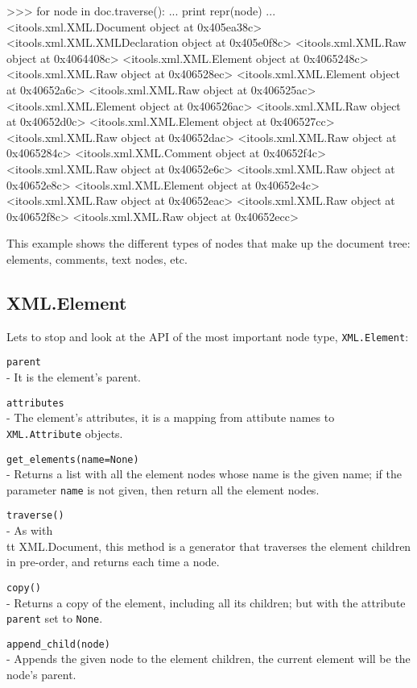 \begin{code}
    >>> for node in doc.traverse():
    ...     print repr(node)
    ... 
    <itools.xml.XML.Document object at 0x405ea38c>
    <itools.xml.XML.XMLDeclaration object at 0x405e0f8c>
    <itools.xml.XML.Raw object at 0x4064408c>
    <itools.xml.XML.Element object at 0x4065248c>
    <itools.xml.XML.Raw object at 0x406528ec>
    <itools.xml.XML.Element object at 0x40652a6c>
    <itools.xml.XML.Raw object at 0x406525ac>
    <itools.xml.XML.Element object at 0x406526ac>
    <itools.xml.XML.Raw object at 0x40652d0c>
    <itools.xml.XML.Element object at 0x406527cc>
    <itools.xml.XML.Raw object at 0x40652dac>
    <itools.xml.XML.Raw object at 0x4065284c>
    <itools.xml.XML.Comment object at 0x40652f4c>
    <itools.xml.XML.Raw object at 0x40652e6c>
    <itools.xml.XML.Raw object at 0x40652e8c>
    <itools.xml.XML.Element object at 0x40652e4c>
    <itools.xml.XML.Raw object at 0x40652eac>
    <itools.xml.XML.Raw object at 0x40652f8c>
    <itools.xml.XML.Raw object at 0x40652ecc>
\end{code}

This example shows the different types of nodes that make up the document
tree: elements, comments, text nodes, etc.

\subsection{XML.Element}

Lets to stop and look at the API of the most important node type,
{\tt XML.Element}:

\begin{api}
    {\tt parent}\\
    - It is the element's parent.

    {\tt attributes}\\
    - The element's attributes, it is a mapping from attibute names to
    {\tt XML.Attribute} objects.

    {\tt get\_elements(name=None)}\\
    - Returns a list with all the element nodes whose name is the given
    name; if the parameter {\tt name} is not given, then return all the
    element nodes.

    {\tt traverse()}\\
    - As with {\\tt XML.Document}, this method is a generator that traverses
    the element children in pre-order, and returns each time a node.

    {\tt copy()}\\
    - Returns a copy of the element, including all its children; but with
    the attribute {\tt parent} set to {\tt None}.

    {\tt append\_child(node)}\\
    - Appends the given node to the element children, the current element will
    be the node's parent.
\end{api}


